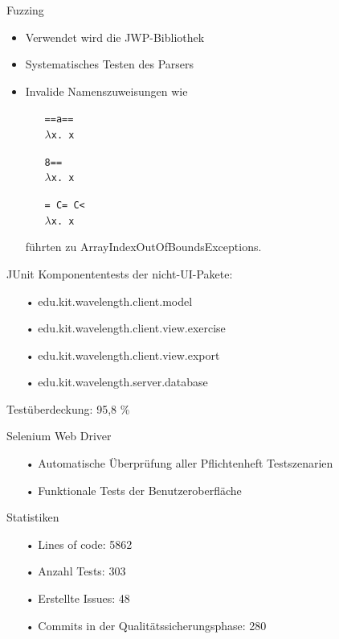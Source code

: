 \documentclass[10pt]{beamer}
\begin{document}
\begin{frame}{Fuzzing} %
\begin{itemize}
	\item Verwendet wird die JWP-Bibliothek
	\item Systematisches Testen des Parsers
	\newline
	\item Invalide Namenszuweisungen wie
	\begin{multicols}{3}
	\begin{itemize}
		\item[] \texttt{==a== \\ $\lambda$x. x}
		\item[] \texttt{8== \\ $\lambda$x. x}
		\item[] \texttt{= C= C< \\ $\lambda$x. x}
	\end{itemize}
	\end{multicols}
	führten zu ArrayIndexOutOfBoundsExceptions.
\end{itemize}
\end{frame}

\begin{frame}{JUnit}
Komponententests der nicht-UI-Pakete:
\begin{itemize}
	\item[•] edu.kit.wavelength.client.model
	\item[•] edu.kit.wavelength.client.view.exercise
	\item[•] edu.kit.wavelength.client.view.export
	\item[•] edu.kit.wavelength.server.database
\end{itemize}
Testüberdeckung: 95,8 \%
\end{frame}

\begin{frame}{Selenium Web Driver}
\begin{itemize}
	\item[•] Automatische Überprüfung aller Pflichtenheft Testszenarien
	\item[•] Funktionale Tests der Benutzeroberfläche
\end{itemize}
\end{frame}

\begin{frame}{Statistiken} %
\begin{itemize}
\item[•] Lines of code: 5862
\item[•] Anzahl Tests: 303
\item[•] Erstellte Issues: 48
\item[•] Commits in der Qualitätssicherungsphase: 280
\end{itemize}
\end{frame}
\end{document}
